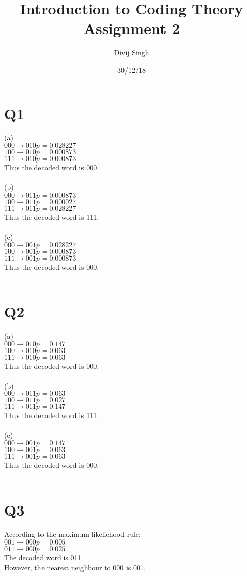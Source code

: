 \documentclass{article}
\title{Introduction to Coding Theory Assignment 2}
\author{Divij Singh}
\date{30/12/18}
\begin{document}
	\maketitle
	
	\section{Q1}
	(a)\\
$000 \rightarrow 010 p=0.028227$\\
$100 \rightarrow 010 p=0.000873$\\
$111 \rightarrow 010 p=0.000873$\\
Thus the decoded word is 000.\\
\\
(b)\\
$000 \rightarrow 011 p=0.000873$\\
$100 \rightarrow 011 p=0.000027$\\
$111 \rightarrow 011 p=0.028227$\\
Thus the decoded word is 111.\\
\\
(c)\\
$000 \rightarrow 001 p=0.028227$\\
$100 \rightarrow 001 p=0.000873$\\
$111 \rightarrow 001 p=0.000873$\\
Thus the decoded word is 000.\\
\\

\section{Q2}
(a)\\
$000 \rightarrow 010 p=0.147$\\
$100 \rightarrow 010 p=0.063$\\
$111 \rightarrow 010 p=0.063$\\
Thus the decoded word is 000.\\
\\
(b)\\
$000 \rightarrow 011 p=0.063$\\
$100 \rightarrow 011 p=0.027$\\
$111 \rightarrow 011 p=0.147$\\
Thus the decoded word is 111.\\
\\
(c)\\
$000 \rightarrow 001 p=0.147$\\
$100 \rightarrow 001 p=0.063$\\
$111 \rightarrow 001 p=0.063$\\
Thus the decoded word is 000.\\
\\

\section{Q3}
According to the maximum likeliehood rule:\\
$001 \rightarrow 000 p= 0.005$\\
$011 \rightarrow 000 p= 0.025$\\
The decoded word is 011\\
However, the nearest neighbour to 000 is 001.
\end{document}
